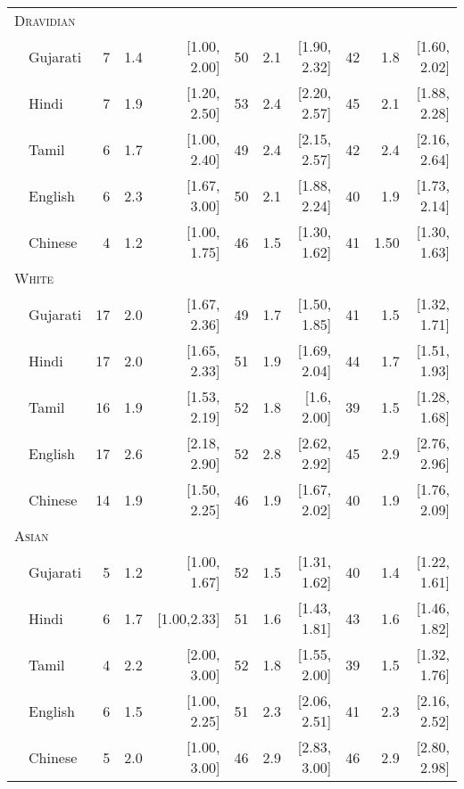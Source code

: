 \begin{table}[H]
\begin{footnotesize}
\begin{tabular}{p{.1in}lrrrrrrrrr}
\midrule
\multicolumn{11}{l}{\textsc{Dravidian}}\\
 & Gujarati & 7 & 1.4 & [1.00, 2.00] & 50 & 2.1 & [1.90, 2.32] & 42 & 1.8 & [1.60, 2.02]\\

 & Hindi & 7 & 1.9 & [1.20, 2.50] & 53 & 2.4 & [2.20, 2.57] & 45 & 2.1 & [1.88, 2.28]\\

& Tamil & 6 & 1.7 & [1.00, 2.40] & 49 & 2.4 & [2.15, 2.57] & 42 & 2.4 & [2.16, 2.64]\\

 & English & 6 & 2.3 & [1.67, 3.00] & 50 & 2.1 & [1.88, 2.24] & 40 & 1.9 & [1.73, 2.14]\\

& Chinese & 4 & 1.2 & [1.00, 1.75] & 46 & 1.5 & [1.30, 1.62] & 41 & 1.50 & [1.30, 1.63]\\
\midrule
\multicolumn{11}{l}{\textsc{White}}\\
& Gujarati & 17 & 2.0 & [1.67, 2.36] & 49 & 1.7 & [1.50, 1.85] & 41 & 1.5 & [1.32, 1.71]\\

 & Hindi & 17 & 2.0 & [1.65, 2.33] & 51 & 1.9 & [1.69, 2.04] & 44 & 1.7 & [1.51, 1.93]\\

& Tamil & 16 & 1.9 & [1.53, 2.19] & 52 & 1.8 & [1.6, 2.00]& 39 & 1.5 & [1.28, 1.68]\\

 & English & 17 & 2.6 & [2.18, 2.90] & 52 & 2.8 & [2.62, 2.92] & 45 & 2.9 & [2.76, 2.96]\\
 
& Chinese & 14 & 1.9 & [1.50, 2.25] & 46 & 1.9 & [1.67, 2.02] & 40 & 1.9 & [1.76, 2.09]\\

\midrule
\multicolumn{11}{l}{\textsc{Asian}}\\
 & Gujarati & 5 & 1.2 & [1.00, 1.67] & 52 & 1.5 & [1.31, 1.62] & 40 & 1.4 & [1.22, 1.61]\\

 & Hindi & 6 & 1.7 & [1.00,2.33] & 51 & 1.6 & [1.43, 1.81] & 43 & 1.6 & [1.46, 1.82]\\

& Tamil & 4 & 2.2 & [2.00, 3.00] & 52 & 1.8 & [1.55, 2.00]& 39 & 1.5 & [1.32, 1.76]\\
 & English & 6 & 1.5 & [1.00, 2.25] & 51 & 2.3 & [2.06, 2.51] & 41 & 2.3 & [2.16, 2.52]\\
 & Chinese & 5 & 2.0 & [1.00, 3.00] & 46 & 2.9 & [2.83, 3.00]& 46 & 2.9 & [2.80, 2.98]\\
\bottomrule
\end{tabular}
\end{footnotesize}
\end{table}